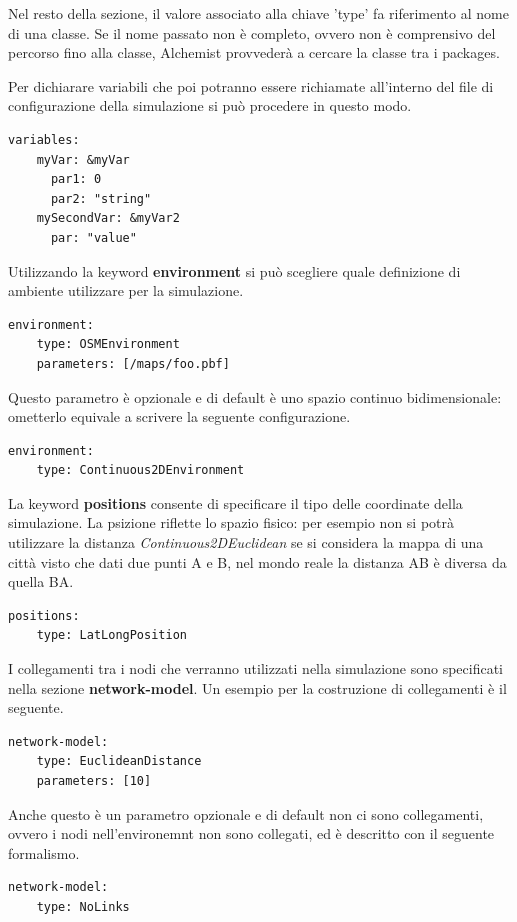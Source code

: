 \documentclass[12pt,a4paper,openright,twoside]{report}
\begin{document}
Nel resto della sezione, il valore associato alla chiave 'type' fa riferimento al nome di una classe. Se il nome passato non \`e completo, ovvero non \`e comprensivo del percorso fino alla classe, Alchemist provveder\`a a cercare la classe tra i packages.

Per dichiarare variabili che poi potranno essere richiamate all'interno del file di configurazione della simulazione si pu\`o procedere in questo modo.
\medskip
\begin{lstlisting}[firstnumber=last,caption={Variabili simulazione}]
  variables:
    myVar: &myVar
      par1: 0
      par2: "string"
    mySecondVar: &myVar2
      par: "value"
\end{lstlisting}

Utilizzando la keyword \textbf{environment} si pu\`o scegliere quale definizione di ambiente utilizzare per la simulazione.
\medskip
\begin{lstlisting}[firstnumber=last,caption={Environment}]
  environment:
    type: OSMEnvironment
    parameters: [/maps/foo.pbf]
\end{lstlisting}
Questo parametro \`e opzionale e di default \`e uno spazio continuo bidimensionale: ometterlo equivale a scrivere la seguente configurazione.
\medskip
\begin{lstlisting}[firstnumber=last,caption={Default environment}]
  environment:
    type: Continuous2DEnvironment
\end{lstlisting}

La keyword \textbf{positions} consente di specificare il tipo delle coordinate della simulazione. La psizione riflette lo spazio fisico: per esempio non si potr\`a utilizzare la distanza \textit{Continuous2DEuclidean} se si considera la mappa di una citt\`a visto che dati due punti A e B, nel mondo reale la distanza AB \`e diversa da quella BA.
\medskip
\begin{lstlisting}[firstnumber=last,caption={Default environment}]
  positions:
    type: LatLongPosition
\end{lstlisting}

I collegamenti tra i nodi che verranno utilizzati nella simulazione sono specificati nella sezione \textbf{network-model}. Un esempio per la costruzione di collegamenti \`e il seguente.
\medskip
\begin{lstlisting}[firstnumber=last,caption={Funzione linking-rule}]
  network-model:
    type: EuclideanDistance
    parameters: [10]
\end{lstlisting}
Anche questo \`e un parametro opzionale e di default non ci sono collegamenti, ovvero i nodi nell'environemnt non sono collegati, ed \`e descritto con il seguente formalismo.
\medskip
\begin{lstlisting}[firstnumber=last,caption={Default linking-rule}]
  network-model:
    type: NoLinks
\end{lstlisting}
\end{document}
